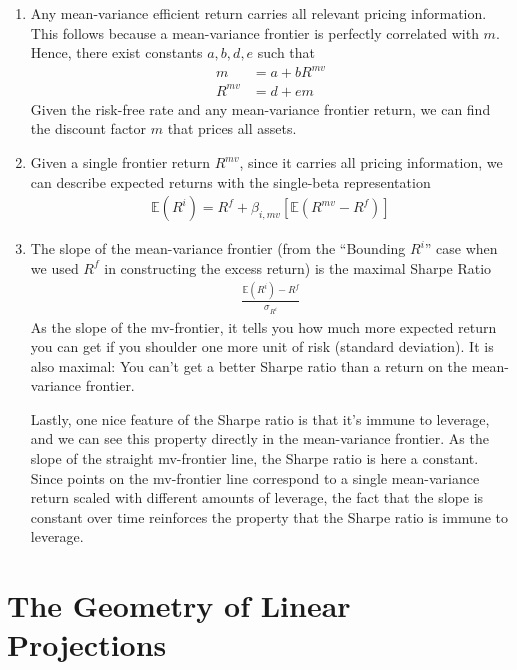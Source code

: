 \documentclass[a4paper,12pt]{scrartcl}
\begin{document}
\begin{enumerate}
  \item Any mean-variance efficient return carries all relevant pricing
    information. This follows because a mean-variance frontier is
    perfectly correlated with $m$. Hence, there exist constants
    $a,b,d,e$ such that
    \begin{align*}
      m &= a + b R^{mv} \\
      R^{mv} &= d + e m
    \end{align*}
    Given the risk-free rate and any mean-variance frontier return, we
    can find the discount factor $m$ that prices all assets.

  \item Given a single frontier return $R^{mv}$, since it carries all
    pricing information, we can describe expected returns with the
    single-beta representation
    \begin{align*}
      \mathbb{E}(R^i) = R^f + \beta_{i,mv} [\mathbb{E}(R^{mv}-R^f)]
    \end{align*}

  \item The slope of the mean-variance frontier (from the ``Bounding
    $R^i$'' case when we used $R^f$ in constructing the excess return)
    is the maximal Sharpe Ratio
    \begin{align*}
      \frac{\mathbb{E}(R^i) - R^f}{\sigma_{R^i}}
    \end{align*}
    As the slope of the mv-frontier, it tells you how much more expected
    return you can get if you shoulder one more unit of risk (standard
    deviation). It is also maximal: You can't get a better Sharpe ratio
    than a return on the mean-variance frontier.

    Lastly, one nice feature of the Sharpe ratio is that it's immune to
    leverage, and we can see this property directly in the mean-variance
    frontier. As the slope of the straight mv-frontier line, the Sharpe
    ratio is here a constant. Since points on the mv-frontier line
    correspond to a single mean-variance return scaled with different
    amounts of leverage, the fact that the slope is constant over time
    reinforces the property that the Sharpe ratio is immune to leverage.



\end{enumerate}




\newpage
\appendix
\section{The Geometry of Linear Projections}
\end{document}
